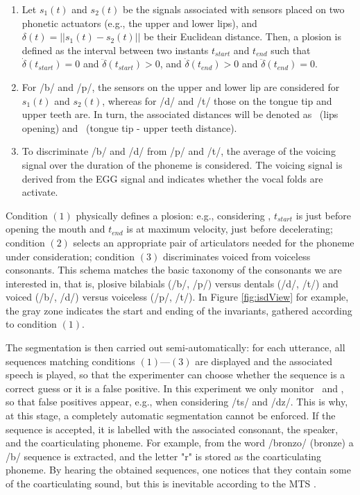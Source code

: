 \begin{enumerate}

  \item
    Let $s_1(t)$ and $s_2(t)$ be the signals associated
    with sensors placed on two phonetic actuators (e.g., the upper and
    lower lips), and $\delta(t) = ||s_1(t)-s_2(t)||$ be their
    Euclidean distance. Then, a plosion is defined as the interval
    between two instants $t_{start}$ and $t_{end}$ such that
    $\dot{\delta}(t_{start}) = 0 $ and $\ddot{\delta}(t_{start}) > 0$,
    and $\dot{\delta}(t_{end}) > 0 $ and $\ddot{\delta}(t_{end}) = 0$.

  \item For /b/ and /p/, the sensors on the upper and lower
    lip are considered for $s_1(t)$ and $s_2(t)$, whereas for /d/ and /t/
    those on the tongue tip and upper teeth are. In turn, the associated
    distances will be denoted as \lio\ (lips opening) and \ttu\
    (tongue tip - upper teeth distance).    

  \item To discriminate /b/ and /d/ from /p/ and /t/, the average of the
    voicing signal over the duration of the phoneme is considered. The
    voicing signal \cite{...} is derived from the EGG signal and indicates
    whether the vocal folds are activate.

\end{enumerate}

Condition $(1)$ physically defines a plosion: e.g., considering \lio, $t_{start}$
is just before opening the mouth and $t_{end}$ is at maximum velocity, just
before decelerating; condition $(2)$ selects an appropriate pair
of articulators needed for the phoneme under consideration;
condition $(3)$ discriminates voiced from voiceless consonants. This schema matches
the basic taxonomy of the consonants we are interested in, that is, plosive
bilabials (/b/, /p/) versus dentals (/d/, /t/) and voiced (/b/, /d/) versus
voiceless (/p/, /t/). In Figure \ref{fig:isdView} for example, the gray zone
indicates the start and ending of the invariants, gathered according to
condition $(1)$.

The segmentation is then carried out semi-automatically: for each
utterance, all sequences matching conditions $(1)$---$(3)$ are displayed and the
associated speech is played, so that the experimenter can choose whether the
sequence is a correct guess or it is a false positive. In this experiment we only
monitor \lio\ and \ttu, so that false positives appear, e.g., when considering
/ts/ and /dz/. This is why, at this stage, a completely automatic segmentation
cannot be enforced. If the sequence is accepted, it is labelled
with the associated consonant, the speaker, and the
coarticulating phoneme. For example, from the word /bronzo/ (bronze) a /b/
sequence is extracted, and the letter "r" is stored as the coarticulating phoneme.
By hearing the obtained sequences, one notices that they contain some of the
coarticulating sound, but this is inevitable according to the MTS \cite{...}. 

